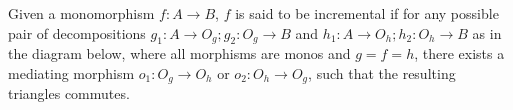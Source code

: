 \begin{definition} Given a monomorphism \mbox{$f : A \rightarrow B$}, $f$ is said to be incremental if for any possible pair of decompositions \mbox{$g_1 : A \rightarrow O_g;g_2 : O_g \rightarrow B$} and \mbox{$h_1 : A \rightarrow O_h;h_2 : O_h \rightarrow B$} as in the diagram below, where all morphisms are monos and $g = f = h$, there exists a mediating morphism $o_1 : O_g \rightarrow O_h$ or $o_2 : O_h \rightarrow O_g$, such that the resulting triangles commutes.



\end{definition}

\begin{definition}
\end{definition}
